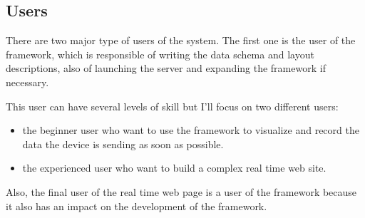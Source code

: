 \documentclass[12pt]{article}
\begin{document}
        \subsection{Users}
            There are two major type of users of the system. The first one is
            the user of the framework, which is responsible of writing the data
            schema and layout descriptions, also of launching the server and
            expanding the framework if necessary.

            This user can have several levels of skill but I'll focus on two
            different users:
            \begin{itemize}
                \item the beginner user who want to use the framework to
                      visualize and record the data the device is sending as
                      soon as possible.
                \item the experienced user who want to build a complex real time
                      web site.
            \end{itemize}

            Also, the final user of the real time web page is a user of the
            framework because it also has an impact on the development of the
            framework.
\end{document}
